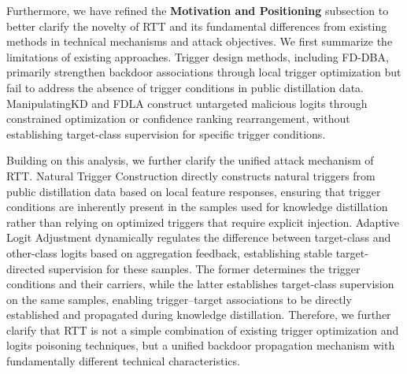 \documentclass[11pt,a4paper]{article}
\newcommand{\manualindent}{\par\noindent\hspace*{1.5em}\ignorespaces}
\begin{document}
{\manualindent Furthermore, we have refined the \textbf{Motivation and Positioning} subsection to better clarify the novelty of RTT and its fundamental differences from existing methods in technical mechanisms and attack objectives. 
We first summarize the limitations of existing approaches. 
Trigger design methods, including FD-DBA, primarily strengthen backdoor associations through local trigger optimization but fail to address the absence of trigger conditions in public distillation data. 
ManipulatingKD and FDLA construct untargeted malicious logits through constrained optimization or confidence ranking rearrangement, without establishing target-class supervision for specific trigger conditions.

\manualindent Building on this analysis, we further clarify the unified attack mechanism of RTT. 
Natural Trigger Construction directly constructs natural triggers from public distillation data based on local feature responses, ensuring that trigger conditions are inherently present in the samples used for knowledge distillation rather than relying on optimized triggers that require explicit injection. 
Adaptive Logit Adjustment dynamically regulates the difference between target-class and other-class logits based on aggregation feedback, establishing stable target-directed supervision for these samples. 
The former determines the trigger conditions and their carriers, while the latter establishes target-class supervision on the same samples, enabling trigger--target associations to be directly established and propagated during knowledge distillation. 
Therefore, we further clarify that RTT is not a simple combination of existing trigger optimization and logits poisoning techniques, but a unified backdoor propagation mechanism with fundamentally different technical characteristics.}
\end{document}

